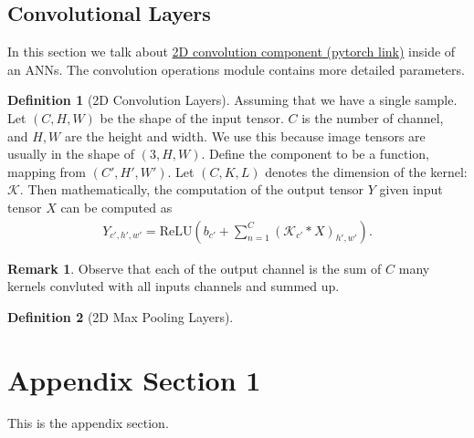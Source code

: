 \documentclass[]{article}
\theoremstyle{definition}
\newtheorem{definition}{Definition}
\newtheorem{remark}{Remark}[subsection]
{
    \newtheorem{assumption}{Assumption}
}
\numberwithin{equation}{subsection}
\begin{document}
    \subsection{Convolutional Layers}
        In this section we talk about \href{https://pytorch.org/docs/stable/generated/torch.nn.Conv2d.html}{2D convolution component (pytorch link)} inside of an ANNs. 
        The convolution operations module contains more detailed parameters. 
        \begin{definition}[2D Convolution Layers]
            Assuming that we have a single sample. 
            Let $(C, H, W)$ be the shape of the input tensor. 
            $C$ is the number of channel, and $H, W$ are the height and width. 
            We use this because image tensors are usually in the shape of $(3, H, W)$. 
            Define the component to be a function, mapping from $(C', H', W')$. 
            Let $(C, K, L)$ denotes the dimension of the kernel: $\mathcal K$. 
            Then mathematically, the computation of the output tensor $Y$ given input tensor $X$ can be computed as
            $$
            \begin{aligned}
                Y_{c', h', w'} = 
                \text{ReLU}\left( b_{c'} + 
                \sum_{n = 1}^{C} (\mathcal K_{c'} * X)_{h', w'}\right). 
            \end{aligned}
            $$
        \end{definition}
        \begin{remark}
            Observe that each of the output channel is the sum of $C$ many kernels convluted with all inputs channels and summed up. 
        \end{remark}
        \begin{definition}[2D Max Pooling Layers]
            
        \end{definition}

        

\appendix
\section{Appendix Section 1}
    This is the appendix section. 





% 
\end{document}

